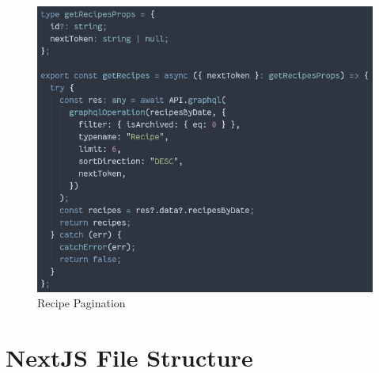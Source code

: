 \begin{figure}[!hb]
\centering
\caption[Recipe Pagination]{Recipe Pagination}%
\label{fig:recipe_pagination}
\includegraphics[width=\linewidth,height=\textheight,keepaspectratio]{img/recipe_pagination}
\end{figure} 

\clearpage

\section{NextJS File Structure} 

